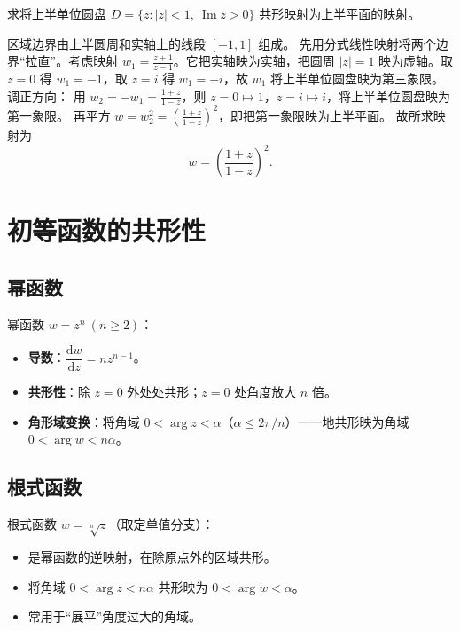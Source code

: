 \begin{example}[边界对应求映射]
  求将上半单位圆盘 \(D = \{z: |z|<1,\ \operatorname{Im}z > 0\}\) 共形映射为上半平面的映射。
\end{example}
\begin{solution}
  区域边界由上半圆周和实轴上的线段 \([-1,1]\) 组成。
  先用分式线性映射将两个边界“拉直”。考虑映射 \(w_1 = \frac{z+1}{z-1}\)。它把实轴映为实轴，把圆周 \(|z|=1\) 映为虚轴。取 \(z=0\) 得 \(w_1=-1\)，取 \(z=i\) 得 \(w_1=-i\)，故 \(w_1\) 将上半单位圆盘映为第三象限。调正方向：
  用 \(w_2 = -w_1 = \frac{1+z}{1-z}\)，则 \(z=0\mapsto 1\)，\(z=i\mapsto i\)，将上半单位圆盘映为第一象限。
  再平方 \(w = w_2^2 = \left(\frac{1+z}{1-z}\right)^2\)，即把第一象限映为上半平面。
  故所求映射为
  \[
  w = \left(\frac{1+z}{1-z}\right)^2.
  \]
\end{solution}

\section{初等函数的共形性}
\subsection{幂函数}
\begin{tcolorbox}[colframe=teal!60!black, colback=teal!5!white, sharp corners]
  幂函数 \(w = z^n \ (n \ge 2)\)：
  \begin{itemize}
    \item \textbf{导数}：\(\dfrac{\mathrm{d}w}{\mathrm{d}z} = nz^{n-1}\)。
    \item \textbf{共形性}：除 \(z=0\) 外处处共形；\(z=0\) 处角度放大 \(n\) 倍。
    \item \textbf{角形域变换}：将角域 \(0 < \arg z < \alpha\)（\(\alpha \le 2\pi/n\)）一一地共形映为角域 \(0 < \arg w < n\alpha\)。
  \end{itemize}
\end{tcolorbox}

\subsection{根式函数}
\begin{tcolorbox}[colframe=teal!60!black, colback=teal!5!white, sharp corners]
  根式函数 \(w = \sqrt[n]{z}\)（取定单值分支）：
  \begin{itemize}
    \item 是幂函数的逆映射，在除原点外的区域共形。
    \item 将角域 \(0 < \arg z < n\alpha\) 共形映为 \(0 < \arg w < \alpha\)。
    \item 常用于“展平”角度过大的角域。
  \end{itemize}
\end{tcolorbox}

